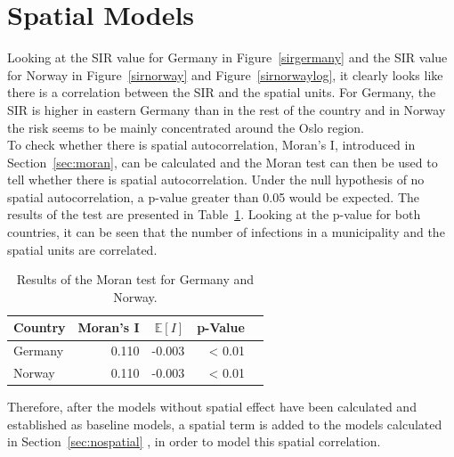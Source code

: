 \section{Spatial Models}\label{ch:spatial}
Looking at the SIR value for Germany in Figure~\ref{sirgermany} and the SIR value for Norway in Figure~\ref{sirnorway} and Figure~\ref{sirnorwaylog}, it clearly looks like there is a correlation between the SIR and the spatial units. For Germany, the SIR is higher in eastern Germany than in the rest of the country and in Norway the risk seems to be mainly concentrated around the Oslo region. \\
To check whether there is spatial autocorrelation, Moran's I, introduced in Section~\ref{sec:moran}, can be calculated and the Moran test can then be used to tell whether there is spatial autocorrelation. Under the null hypothesis of no spatial autocorrelation, a p-value greater than 0.05 would be expected. The results of the test are presented in Table~\ref{moranTest}. Looking at the p-value for both countries, it can be seen that the number of infections in a municipality and the spatial units are correlated.
\begin{table}[H] 
\caption{Results of the Moran test for Germany and Norway. \label{moranTest}}
\begin{tabular}{l r r r r}
\toprule
\textbf{Country} & \textbf{Moran's I}	& \textbf{$\mathbb{E}\left[I\right]$}	& \textbf{p-Value} \\
\midrule
Germany & 0.110 & -0.003 & < 0.01 \\
Norway & 0.110 & -0.003 & < 0.01 \\
\bottomrule
\end{tabular}
\end{table}
Therefore, after the models without spatial effect have been calculated and established as baseline models, a spatial term is added to the models calculated in Section~\ref{sec:nospatial} , in order to model this spatial correlation.
